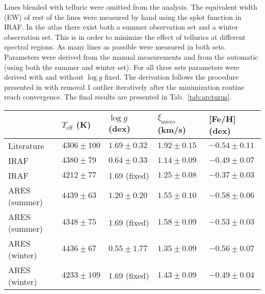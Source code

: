 \documentclass{aa}
\begin{document}
Lines blended with telluric were omitted from the analysis. The equivalent width
(EW) of rest of the lines were measured by hand using the splot function in
IRAF. In the atlas there exist both a summer observation set and a winter
observation set. This is in order to minimize the effect of tellurics at
different spectral regions. As many lines as possible were measured in both
sets. Parameters were derived from the manual measurements and from the
automatic (using both the summer and winter set). For all three sets parameters
were derived with and without $\log g$ fixed. The derivation follows the
procedure presented in \citet{Andreasen2016} with removal 1 outlier iteratively
after the minimization routine \citep{Andreasen2017a} reach convergence. The
final results are presented in Tab.~\ref{tab:arcturus}.


\begin{table*}[htb!]
    \caption{The derived parameters for Arcturus with and without fixed surface
             gravity after 3$\sigma$ outlier removal. The litereature values are
             a simple mean of all the available parameters on Simbad with the
             corresponding standard error. There is no microturbulence
             available, so we derived it ourself using the empirical relation
             from \citet{Adibekyan2015} for each set of parameters.}
    \label{tab:arcturus}
    \centering
    \begin{tabular}{lllll}
      \hline\hline
                      & $T_\mathrm{eff}$ (K) &  $\log g$ (dex)  &   $\xi_\mathrm{micro}$ (km/s)   & [Fe/H] (dex)     \\
      \hline
        Literature    & $4306 \pm 100$       &  $1.69 \pm 0.32$ &    $1.92 \pm 0.15$              & $-0.54 \pm 0.11$ \\
      \hline
        IRAF          & $4380 \pm  79$       &  $0.64 \pm 0.33$ &    $1.14 \pm 0.09$              & $-0.49 \pm 0.07$ \\
        IRAF          & $4212 \pm  77$       &   1.69 (fixed)   &    $1.25 \pm 0.08$              & $-0.37 \pm 0.03$ \\
      \hline
        ARES (summer) & $4439 \pm  63$       &  $1.20 \pm 0.20$ &    $1.55 \pm 0.10$              & $-0.58 \pm 0.06$ \\
        ARES (summer) & $4348 \pm  75$       &   1.69 (fixed)   &    $1.58 \pm 0.09$              & $-0.53 \pm 0.03$ \\
        ARES (winter) & $4436 \pm  67$       &  $0.55 \pm 1.77$ &    $1.35 \pm 0.09$              & $-0.56 \pm 0.07$ \\
        ARES (winter) & $4233 \pm 109$       &   1.69 (fixed)   &    $1.43 \pm 0.09$              & $-0.49 \pm 0.04$ \\
      \hline
    \end{tabular}
\end{table*}
\end{document}
